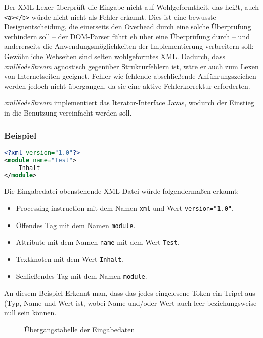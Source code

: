 \documentclass[10pt,a4paper,ngerman,titlepage,tocindentauto]{article}
\begin{document}
			Der XML-Lexer überprüft die Eingabe nicht auf Wohlgeformtheit, das heißt, auch
			\verb|<a></b>| würde nicht nicht als Fehler erkannt. Dies ist eine bewusste Designentscheidung,
			die einerseits den Overhead durch eine solche Überprüfung verhindern soll – der DOM-Parser
			führt eh über eine Überprüfung durch – und andererseits die Anwendungsmöglichkeiten der Implementierung
			verbreitern soll: Gewöhnliche Webseiten sind selten wohlgeformtes XML. Dadurch,
			dass {\em xmlNodeStream} agnostisch gegenüber Strukturfehlern ist, wäre er auch zum
			Lexen von Internetseiten geeignet. Fehler wie fehlende abschließende Anführungszeichen werden
			jedoch nicht übergangen, da sie eine aktive Fehlerkorrektur erforderten.
			
			{\em xmlNodeStream} implementiert das Iterator-Interface Javas, wodurch der Einstieg in die
			Benutzung vereinfacht werden soll.
			
			\subsubsection*{Beispiel}
				\begin{lstlisting}[frame=single,language=XML,caption=Beispiel.xml]
<?xml version="1.0"?>
<module name="Test">
	Inhalt
</module>
				\end{lstlisting}
				Die Eingabedatei obenstehende XML-Datei würde folgendermaßen erkannt:
				\begin{itemize}
					\item Processing instruction mit dem Namen \verb|xml| und Wert \verb|version="1.0"|.
					\item Öffendes Tag mit dem Namen \verb|module|.
					\item Attribute mit dem Namen \verb|name| mit dem Wert \verb|Test|.
					\item Textknoten mit dem Wert \verb|Inhalt|.
					\item Schließendes Tag mit dem Namen \verb|module|.
				\end{itemize}
				An diesem Beispiel Erkennt man, dass das jedes eingelesene Token ein Tripel aus
				(Typ, Name und Wert ist, wobei Name und/oder Wert auch leer beziehungsweise null sein können.
			
			\begin{figure}[ht]
				\caption[Übergangstabelle der Eingabedaten]{\hypertarget{Uebergangsdiagramm_XML_Lexer}{Übergangstabelle der Eingabedaten}}
			\end{figure}
			
\end{document}
